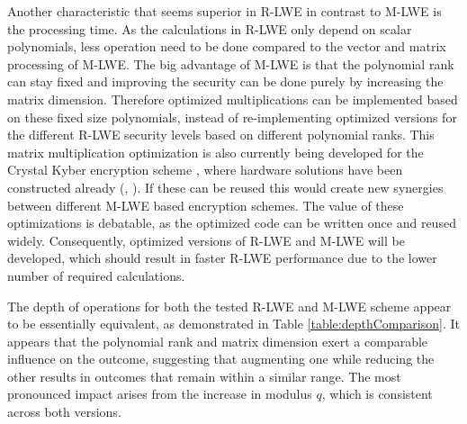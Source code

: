 Another characteristic that seems superior in R-LWE in contrast to M-LWE is the processing time. As the calculations in R-LWE only depend on scalar polynomials, less operation need to be done compared to the vector and matrix processing of M-LWE. The big advantage of M-LWE is that the polynomial rank can stay fixed and improving the security can be done purely by increasing the matrix dimension. Therefore optimized multiplications can be implemented based on these fixed size polynomials, instead of re-implementing optimized versions for the different R-LWE security levels based on different polynomial ranks. This matrix multiplication optimization is also currently being developed for the Crystal Kyber encryption scheme \cite{CyrstalsKyber}, where hardware solutions have been constructed already (\cite{KyberHardware}, \cite{KyberHardware2}). If these can be reused this would create new synergies between different M-LWE based encryption schemes. The value of these optimizations is debatable, as the optimized code can be written once and reused widely. Consequently, optimized versions of R-LWE and M-LWE will be developed, which should result in faster R-LWE performance due to the lower number of required calculations.

The depth of operations for both the tested R-LWE and M-LWE scheme appear to be essentially equivalent, as demonstrated in Table \ref{table:depthComparison}. It appears that the polynomial rank and matrix dimension exert a comparable influence on the outcome, suggesting that augmenting one while reducing the other results in outcomes that remain within a similar range. The most pronounced impact arises from the increase in modulus $q$, which is consistent across both versions.

